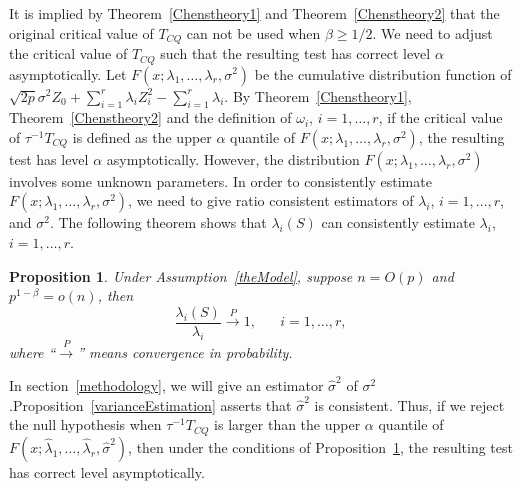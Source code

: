 \documentclass[review]{elsarticle}
\theoremstyle{plain}
\newtheorem{theorem}{\quad\quad Theorem}
\newtheorem{proposition}{\quad\quad Proposition}
\theoremstyle{definition}
\theoremstyle{remark}
\begin{document}

It is implied by Theorem~\ref{Chenstheory1} and Theorem~\ref{Chenstheory2} that the original critical value of $T_{CQ}$ can not be used when $\beta\geq 1/2$.
We need to adjust the critical value of $T_{CQ}$ such that the resulting test has correct level $\alpha$ asymptotically.
Let $F(x;\lambda_1,\ldots,\lambda_r,\sigma^2)$ be the cumulative distribution function of 
$
\sqrt{2p}\sigma^2 Z_0
+
        \sum_{i=1}^r \lambda_i Z_i^2
            -
        \sum_{i=1}^r \lambda_i
        $.
By Theorem~\ref{Chenstheory1}, Theorem~\ref{Chenstheory2} and the definition of $\omega_i$, $i=1,\ldots,r$, if the critical value of $\tau^{-1}T_{CQ}$ is defined as the upper $\alpha$ quantile of
$F(x;\lambda_1,\ldots,\lambda_r,\sigma^2)$, the resulting test has level $\alpha$ asymptotically.
        However, the distribution $F(x;\lambda_1,\ldots,\lambda_r,\sigma^2)$ involves some unknown parameters.
In order to consistently estimate $F(x;\lambda_1,\ldots,\lambda_r,\sigma^2)$, we need to give ratio consistent estimators of $\lambda_i$, $i=1,\ldots,r$, and $\sigma^2$.
The following theorem shows that  $\lambda_i(S)$ can consistently estimate $\lambda_i$, $i=1,\ldots,r$.
\begin{proposition}\label{eigenconsis}
    Under Assumption~\ref{theModel}, suppose $n=O(p)$ and $p^{1-\beta}=o(n)$, then
    $$
    \frac{\lambda_i(S)}{\lambda_i}\xrightarrow{P}1,\quad\text{ $i=1,\ldots,r$},
    $$
    where ``$\xrightarrow{P}$'' means convergence in probability.
\end{proposition}
In section~\ref{methodology}, we will give an estimator $\hat{\sigma}^2$ of $\sigma^2$.Proposition~\ref{varianceEstimation} asserts that $\hat{\sigma}^2$ is consistent.
Thus, if we reject the null hypothesis when
$\tau^{-1}{T_{CQ}}$ is larger than the upper $\alpha$ quantile of $F(x;\hat{\lambda}_1,\ldots,\hat{\lambda}_r,\hat{\sigma}^2)$, then under the conditions of Proposition~\ref{eigenconsis}, the resulting test has correct level asymptotically.
\end{document}
